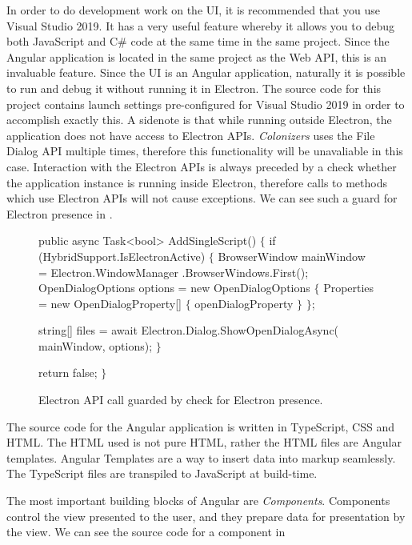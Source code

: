In order to do development work on the UI, it is recommended that you use
Visual Studio 2019. It has a very useful feature whereby it allows you to debug
both JavaScript and C\# code at the same time in the same project. Since the Angular
application is located in the same project as the Web API, this is an invaluable
feature. Since the UI is an Angular application, naturally it is possible
to run and debug it without running it in Electron. The source code for this project
contains launch settings pre-configured for Visual Studio 2019 in order to accomplish
exactly this. A sidenote is that while running outside Electron, the application
does not have access to Electron APIs. \emph{Colonizers} uses the File Dialog
API multiple times, therefore this functionality will be unavaliable in this case.
Interaction with the Electron APIs is always preceded by a check whether
the application instance is running inside Electron, therefore calls
to methods which use Electron APIs will not cause exceptions. We can see
such a guard for Electron presence in .

\begin{figure}[hb]
\begin{code}[commandchars=\\\{\},codes={\catcode`\$=3\catcode`\^=7\catcode`\_=8}]
public async Task<bool> AddSingleScript()
$\{$
    if (HybridSupport.IsElectronActive)
    $\{$
        BrowserWindow mainWindow = Electron.WindowManager
            .BrowserWindows.First();
        OpenDialogOptions options = new OpenDialogOptions
        $\{$
            Properties = new OpenDialogProperty[] $\{$
                    openDialogProperty
                $\}$
        $\}$;

        string[] files = await Electron.Dialog.ShowOpenDialogAsync(
            mainWindow, options);
    $\}$

    return false;
$\}$
\end{code}
\caption{Electron API call guarded by check for Electron presence.}\label{dd:electronguard}
\end{figure}

The source code for the Angular application is written in TypeScript, CSS and HTML.
The HTML used is not pure HTML, rather the HTML files are Angular templates.
Angular Templates are a way to insert data into markup seamlessly.
The TypeScript files are transpiled to JavaScript at build-time.

The most important building blocks of Angular are \emph{Components}.
Components control the view presented to the user, and they prepare
data for presentation by the view. We can see the source code for a component
in 

